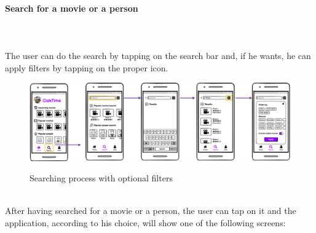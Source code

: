 \documentclass[12pt, a4paper]{article}
\numberwithin{figure}{section}
\begin{document}
\paragraph{Search for a movie or a person}
\mbox{}\\\\
The user can do the search by tapping on the search bar and, if he wants, he can apply filters by tapping
on the proper icon.\\
\begin{figure}[H]
	\centering
	\includegraphics[width=1\textwidth]{images/mockups/search2.png}\\
	\caption{Searching process with optional filters}
\end{figure}
\mbox{}\\
\noindent
After having searched for a movie or a person, the user can tap on it and the application, according
to his choice, will show one of the following screens:
\end{document}
